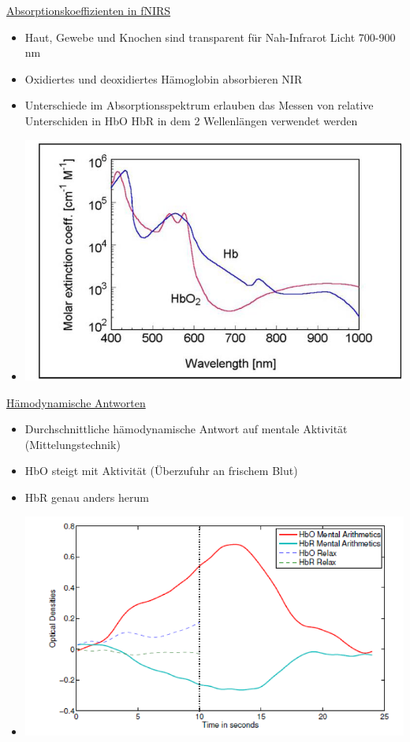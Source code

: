 \documentclass[a4paper,10pt,oneside]{article}
\begin{document}
\underline{Absorptionskoeffizienten in fNIRS} \\
 	\begin{itemize}
 		\item Haut, Gewebe und Knochen sind transparent für Nah-Infrarot Licht 700-900 nm
 		\item Oxidiertes und deoxidiertes Hämoglobin absorbieren NIR
 		\item Unterschiede im Absorptionsspektrum erlauben das Messen von relative Unterschiden in HbO HbR in dem 2 Wellenlängen verwendet werden
 		\item[] \includegraphics[scale=0.2]{Grafiken/2114.png}
 	\end{itemize}
 	
\underline{Hämodynamische Antworten} \\
 	\begin{itemize}
 		\item Durchschnittliche hämodynamische Antwort auf mentale Aktivität (Mittelungstechnik)
 		\item HbO steigt mit Aktivität (Überzufuhr an frischem Blut)
 		\item HbR genau anders herum 
 		\item[] \includegraphics[scale=0.2]{Grafiken/2115.png}
 	\end{itemize}
 	
\end{document}
